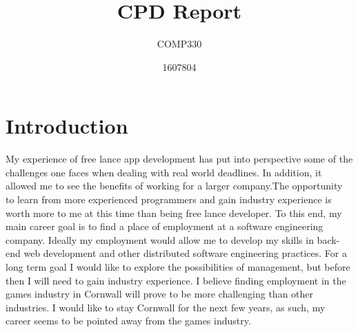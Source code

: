 \documentclass{scrartcl}
\title{CPD Report}
\subtitle{COMP330}
\author{1607804}
\begin{document}
\maketitle

\section{Introduction}
My experience of free lance app development has put into perspective some of the challenges one faces when dealing with real world deadlines. In addition, it allowed me to see the benefits of working for a larger company.The opportunity to learn from more experienced programmers and gain industry experience is worth more to me at this time than being free lance developer. To this end, my main career goal is to find a place of employment at a software engineering company. Ideally my employment would allow me  to develop my skills in back-end web development and other distributed software engineering practices. For a long term goal I would like to explore the possibilities of management, but before then I will need to gain industry experience. I believe finding employment in the games industry in Cornwall will prove to be more challenging than other industries. I would like to stay Cornwall for the next few years, as such, my career seems to be pointed away from the games industry.
\end{document}
